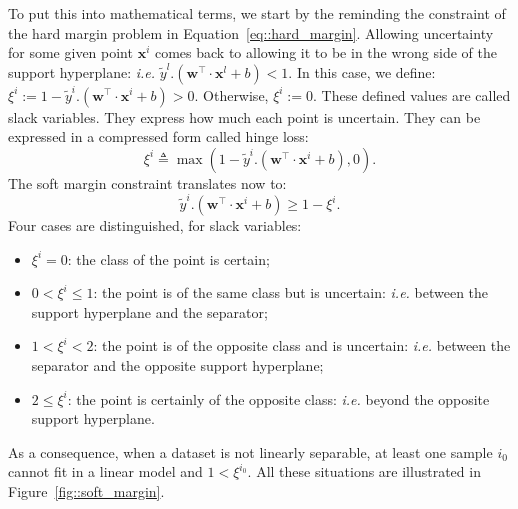                To put this into mathematical terms, we start by the reminding the constraint of the hard margin problem in Equation~\ref{eq::hard_margin}.
                Allowing uncertainty for some given point $\bm{x}^i$ comes back to allowing it to be in the wrong side of the support hyperplane: \textit{i.e.} $\tilde{y}^l.(\bm{w}^\intercal\cdot\bm{x}^l + b) < 1$.
                In this case, we define: $\xi^i := 1 - \tilde{y}^i.(\bm{w}^\intercal\cdot\bm{x}^i + b) > 0$.
                Otherwise, $\xi^i := 0$.
                These defined values are called slack variables.
                They express how much each point is uncertain.
                They can be expressed in a compressed form called hinge loss:
                \begin{equation}
                    \label{eq::slack_variables}
                    \xi^i \triangleq \max\left(1 - \tilde{y}^i.(\bm{w}^\intercal\cdot\bm{x}^i + b), 0\right).
                \end{equation}
                The soft margin constraint translates now to:
                \begin{equation}
                    \label{eq::soft_margin}
                    \tilde{y}^i.(\bm{w}^\intercal\cdot\bm{x}^i + b) \geq 1 - \xi^i.
                \end{equation}
                Four cases are distinguished, for slack variables:
                \begin{itemize}
                    \item $\xi^i = 0$: the class of the point is certain;
                    \item $0 < \xi^i \leq 1$: the point is of the same class but is uncertain: \textit{i.e.} between the support hyperplane and the separator;
                    \item $1 < \xi^i < 2$: the point is of the opposite class and is uncertain: \textit{i.e.} between the separator and the opposite support hyperplane;
                    \item $2 \leq \xi^i$: the point is certainly of the opposite class: \textit{i.e.} beyond the opposite support hyperplane.
                \end{itemize}
                As a consequence, when a dataset is not linearly separable, at least one sample $i_0$ cannot fit in a linear model and $1 < \xi^{i_0}$.
                All these situations are illustrated in Figure~\ref{fig::soft_margin}.\\

